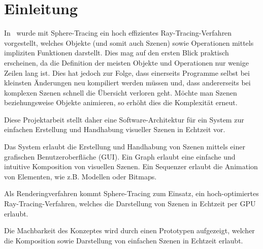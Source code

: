 
\chapter{Einleitung}
\label{chap:10_introduction}

In~\cite{osterwalder_sven_volume_2016} wurde mit Sphere-Tracing ein hoch
effizientes Ray-Tracing-Verfahren vorgestellt, welches Objekte (und somit auch
Szenen) sowie Operationen mittels impliziten Funktionen darstellt. Dies mag auf
den ersten Blick praktisch erscheinen, da die Definition der meisten Objekte
und Operationen nur wenige Zeilen lang ist. Dies hat jedoch zur Folge, dass
einerseits Programme selbst bei kleinsten Änderungen neu kompiliert werden
müssen und, dass andererseits bei komplexen Szenen schnell die Übersicht
verloren geht. Möchte man Szenen beziehungsweise Objekte animieren, so erhöht
dies die Komplexität erneut.

Diese Projektarbeit stellt daher eine Software-Architektur für ein System zur
einfachen Erstellung und Handhabung visueller Szenen in Echtzeit vor.

Das System erlaubt die Erstellung und Handhabung von Szenen mittels einer
grafischen Benutzeroberfläche (GUI). Ein Graph erlaubt eine einfache und
intuitive Komposition von visuellen Szenen. Ein Sequenzer erlaubt die Animation
von Elementen, wie z.B. Modellen oder Bitmaps.

Als Renderingverfahren kommt Sphere-Tracing
zum Einsatz, ein hoch-optimiertes Ray-Tracing-Verfahren, welches die
Darstellung von Szenen in Echtzeit per GPU erlaubt.

Die Machbarkeit des Konzeptes wird durch einen Prototypen aufgezeigt, welcher
die Komposition sowie Darstellung von einfachen Szenen in Echtzeit erlaubt.
